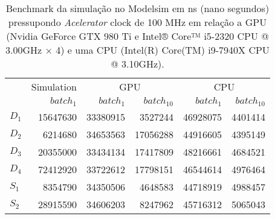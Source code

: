 \begin{table}[ht!]
\centering
\caption{Benchmark da simulação no Modelsim em ns (nano segundos) pressupondo \textit{Acelerator} clock de 100 MHz em relação a GPU (Nvidia GeForce GTX 980 Ti e Intel® Core™ i5-2320 CPU @ 3.00GHz × 4) e uma CPU (Intel(R) Core(TM) i9-7940X CPU @ 3.10GHz).}
\label{tab:5-dnn-benchmark}
\begin{tabular}{lrrrrr}
\toprule
 & Simulation & \multicolumn{2}{c}{GPU} & \multicolumn{2}{c}{CPU} \\
\cmidrule(lr){3-4} \cmidrule(l){5-6}
 & $batch_{1}$ & $batch_{1}$ & $batch_{10}$ & $batch_{1}$ & $batch_{10}$ \\
\midrule
$D_1$ & 15647630 & 33380915 & 3527244 & 46928075 & 4401414 \\
$D_2$ & 6214680 & 34653563 & 17056288 & 44916605 & 4395149 \\
$D_3$ & 20355000 & 33434134 & 17417809 & 48216661 & 4684521 \\
$D_4$ & 72412920 & 33722612 & 17798151 & 46544614 & 4976464 \\
$S_1$ & 8354790 & 34350506 & 4648583 & 44718919 & 4988457 \\
$S_2$ & 28915590 & 34606203 & 8247962 & 45716312 & 5065043 \\
\bottomrule
\end{tabular}
\end{table}